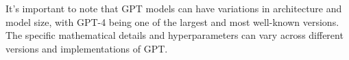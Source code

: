 It's important to note that GPT models can have variations in
architecture and model size, with GPT-4 being one of the largest and
most well-known versions. The specific mathematical details and
hyperparameters can vary across different versions and implementations
of GPT.

%

